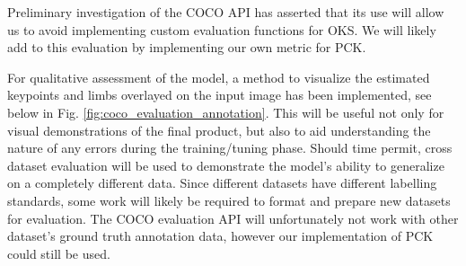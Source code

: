 \documentclass[11pt, letterpaper]{article}
\begin{document}
Preliminary investigation of the COCO API has asserted that its use will allow us to avoid implementing custom evaluation functions for OKS. We will likely add to this evaluation by implementing our own metric for PCK.

For qualitative assessment of the model, a method to visualize the estimated keypoints and limbs overlayed on the input image has been implemented, see below in Fig. \ref{fig:coco_evaluation_annotation}. This will be useful not only for visual demonstrations of the final product, but also to aid understanding the nature of any errors during the training/tuning phase. Should time permit, cross dataset evaluation will be used to demonstrate the model’s ability to generalize on a completely different data. Since different datasets have different labelling standards, some work will likely be required to format and prepare new datasets for evaluation. The COCO evaluation API will unfortunately not work with other dataset’s ground truth annotation data, however our implementation of PCK could still be used. 
\end{document}
